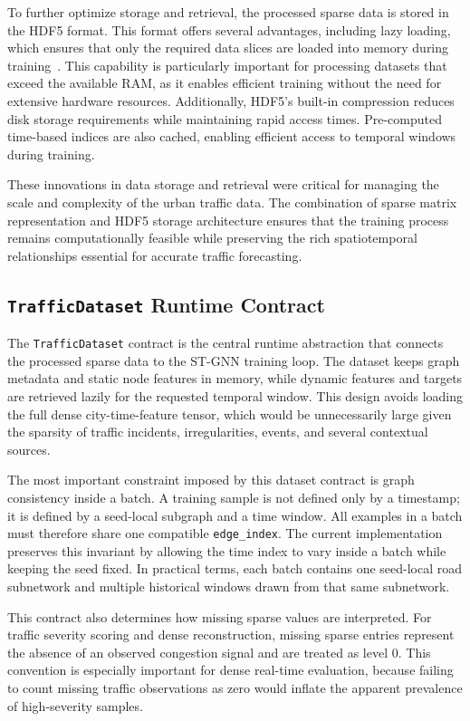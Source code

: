 \documentclass[11pt, a4paper]{article}
\begin{document}
To further optimize storage and retrieval, the processed sparse data is stored in the HDF5 format. This format offers several advantages, including lazy loading, which ensures that only the required data slices are loaded into memory during training~\cite{hdf1997hierarchical}. This capability is particularly important for processing datasets that exceed the available RAM, as it enables efficient training without the need for extensive hardware resources. Additionally, HDF5's built-in compression reduces disk storage requirements while maintaining rapid access times. Pre-computed time-based indices are also cached, enabling efficient access to temporal windows during training.

These innovations in data storage and retrieval were critical for managing the scale and complexity of the urban traffic data. The combination of sparse matrix representation and HDF5 storage architecture ensures that the training process remains computationally feasible while preserving the rich spatiotemporal relationships essential for accurate traffic forecasting.

\subsection{\texttt{TrafficDataset} Runtime Contract}

The \texttt{TrafficDataset} contract is the central runtime abstraction that connects the processed sparse data to the ST-GNN training loop. The dataset keeps graph metadata and static node features in memory, while dynamic features and targets are retrieved lazily for the requested temporal window. This design avoids loading the full dense city-time-feature tensor, which would be unnecessarily large given the sparsity of traffic incidents, irregularities, events, and several contextual sources.

The most important constraint imposed by this dataset contract is graph consistency inside a batch. A training sample is not defined only by a timestamp; it is defined by a seed-local subgraph and a time window. All examples in a batch must therefore share one compatible \texttt{edge\_index}. The current implementation preserves this invariant by allowing the time index to vary inside a batch while keeping the seed fixed. In practical terms, each batch contains one seed-local road subnetwork and multiple historical windows drawn from that same subnetwork.

This contract also determines how missing sparse values are interpreted. For traffic severity scoring and dense reconstruction, missing sparse entries represent the absence of an observed congestion signal and are treated as level 0. This convention is especially important for dense real-time evaluation, because failing to count missing traffic observations as zero would inflate the apparent prevalence of high-severity samples.
\end{document}
